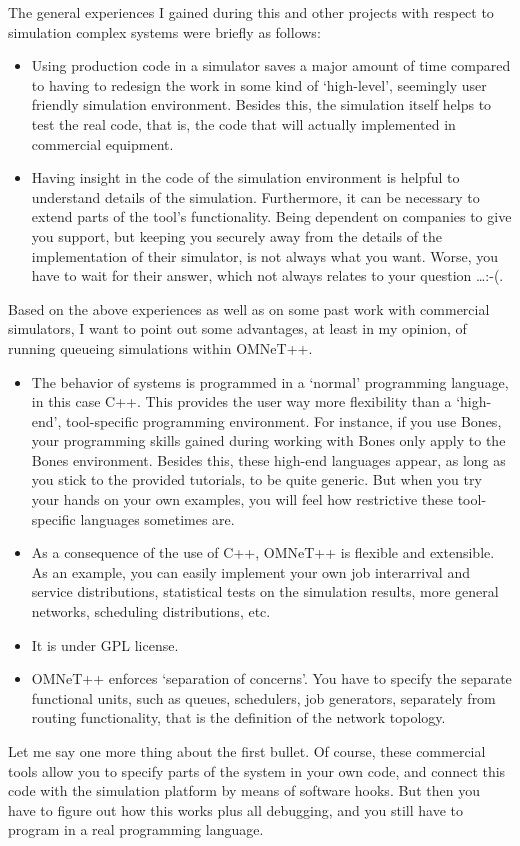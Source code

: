 \documentclass[a4paper]{article}
\begin{document}
The general experiences I gained during this and other projects with
respect to simulation complex systems were briefly as follows:
\begin{itemize}
\item Using production code in a simulator saves a major amount of
  time compared to having to redesign the work in some kind of
  `high-level', seemingly user friendly simulation environment.
  Besides this, the simulation itself helps to test the real code,
  that is, the code that will actually implemented in commercial
  equipment.
\item Having insight in the code of the simulation environment is
  helpful to understand details of the simulation. Furthermore, it can
  be necessary to extend parts of the tool's functionality. Being
  dependent on companies to give you support, but keeping you securely
  away from the details of the implementation of their simulator, is
  not always what you want. Worse, you have to wait for their answer,
  which not always relates to your question \ldots :-(.
\end{itemize}
Based on the above experiences as well as on some past work with
commercial simulators, I want to point out some advantages, at least
in my opinion, of running queueing simulations within OMNeT++.
\begin{itemize}
\item The behavior of  systems is programmed in a `normal'
  programming language, in this case C++. This provides the user way
  more flexibility than a `high-end', tool-specific programming
  environment. For instance, if you use Bones, your programming skills
  gained during working with Bones only apply to the Bones
  environment. Besides this, these high-end languages appear, as long
  as you stick to the provided tutorials, to be quite generic. But
  when you try your hands on your own examples,  you will feel how
  restrictive these tool-specific languages sometimes  are.
\item As a consequence of the use of C++, OMNeT++ is flexible and
  extensible. As an example, you can easily implement your own job
  interarrival and service distributions, statistical tests on the
  simulation results, more general networks, scheduling distributions,
  etc.
\item It is under GPL license.
\item OMNeT++ enforces `separation of concerns'. You have to specify
  the separate functional units, such as queues, schedulers, job
  generators, separately from routing functionality, that is the
  definition of the network topology.
\end{itemize}
Let me say one more thing about the first bullet. Of course, these
commercial tools allow you to specify parts of the system in your own
code, and connect this code with the simulation platform by means of
software hooks.  But then you have to figure out how this works plus
all debugging, and you still have to program in a real programming
language.
\end{document}
